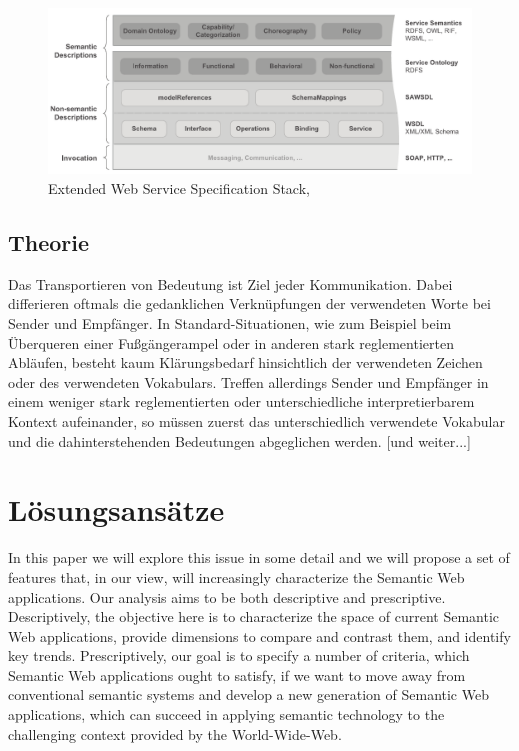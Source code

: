 \documentclass[10pt,a4paper]{article}
\begin{document}
\begin{figure}
\includegraphics[width=14cm]{media/Extended-Web-Service-Specification-Stack.pdf}
\caption{Extended Web Service Specification Stack, \cite{WSMOLITE}}
\end{figure}

\subsection{Theorie}


Das Transportieren von Bedeutung ist Ziel jeder Kommunikation. Dabei
differieren oftmals die gedanklichen Verknüpfungen der verwendeten Worte bei
Sender und Empfänger. In Standard-Situationen, wie zum Beispiel beim
Überqueren einer Fußgängerampel oder in anderen stark reglementierten
Abläufen, besteht kaum Klärungsbedarf hinsichtlich der verwendeten Zeichen
oder des verwendeten Vokabulars. Treffen allerdings Sender und Empfänger in
einem weniger stark reglementierten oder unterschiedliche interpretierbarem
Kontext aufeinander, so müssen zuerst das unterschiedlich verwendete Vokabular
und die dahinterstehenden Bedeutungen abgeglichen werden. [und weiter...] \cite{sgthesis}

\section{Lösungsansätze}
\label{l:loesungen}

In this paper we will explore this issue in some detail and we will propose a set of
features that, in our view, will increasingly characterize the Semantic Web
applications. Our analysis aims to be both descriptive and prescriptive. Descriptively,
the objective here is to characterize the space of current Semantic Web applications,
provide dimensions to compare and contrast them, and identify key trends.
Prescriptively, our goal is to specify a number of criteria, which Semantic Web
applications ought to satisfy, if we want to move away from conventional semantic
systems and develop a new generation of Semantic Web applications, which can
succeed in applying semantic technology to the challenging context provided by the
World-Wide-Web. \cite{ngswa}
\end{document}

